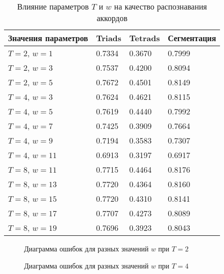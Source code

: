 \begin{table} [htbp]
  \centering
  \parbox{15cm}{\caption{Влияние параметров $T$ и $w$ на качество распознавания
  аккордов} \label{TTw}}
  \begin{tabular}{|l|l|l|l|}
  \hline
  Значения параметров & Triads & Tetrads & Сегментация \\
  \hline
  $T = 2$, $w = 1$ & 0.7334 & 0.3670 & 0.7999 \\
  $T = 2$, $w = 3$ & 0.7537 & 0.4200 & 0.8094 \\
  $T = 2$, $w = 5$ & 0.7672 & 0.4501 & 0.8149 \\
  \hline
  $T = 4$, $w = 3$ & 0.7624 & 0.4621 & 0.8115 \\
  $T = 4$, $w = 5$ & 0.7619 & 0.4440 & 0.7992 \\
  $T = 4$, $w = 7$ & 0.7425 & 0.3909 & 0.7664 \\
  $T = 4$, $w = 9$ & 0.7194 & 0.3583 & 0.7307 \\
  $T = 4$, $w = 11$ & 0.6913 & 0.3197 & 0.6917 \\
  \hline
  $T = 8$, $w = 11$ & 0.7715 & 0.4464 & 0.8176 \\
  $T = 8$, $w = 13$ & 0.7720 & 0.4364 & 0.8160 \\
  $T = 8$, $w = 15$ & 0.7720 & 0.4310 & 0.8141 \\
  $T = 8$, $w = 17$ & 0.7707 & 0.4273 & 0.8089 \\
  $T = 8$, $w = 19$ & 0.7696 & 0.3923 & 0.8043 \\
  \hline
  \end{tabular}
\end{table}

\begin{figure}[h]
  \begin{minipage}[h]{0.49\linewidth}
  \end{minipage}
  \hfill
  \begin{minipage}[h]{0.49\linewidth}
  \end{minipage}
  \caption{Диаграмма ошибок для разных значений $w$ при $T=2$}
  \label{img:T2}
\end{figure}

\begin{figure}[h]
  \begin{minipage}[h]{0.49\linewidth}
  \end{minipage}
  \hfill
  \begin{minipage}[h]{0.49\linewidth}
  \end{minipage}
  \caption{Диаграмма ошибок для разных значений $w$ при $T=4$}
  \label{img:T4}
\end{figure}

